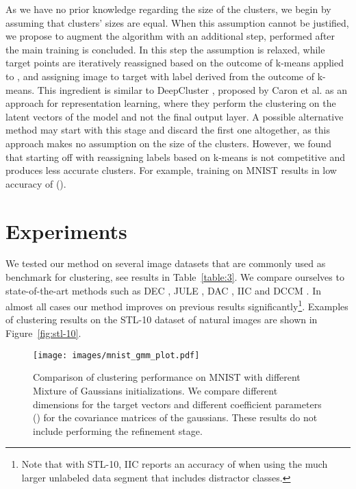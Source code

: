 \documentclass[a4paper,conference]{IEEEtran}
\begin{document}
As we have no prior knowledge regarding the size of the clusters, we begin by assuming that clusters' sizes are equal. When this assumption cannot be justified, we propose to augment the algorithm with an additional step, performed after the main training is concluded. In this step the assumption is relaxed, while target points are iteratively reassigned based on the outcome of k-means applied to , and assigning image  to target  with label  derived from the outcome of k-means. This ingredient is similar to DeepCluster \cite{caron2018deep}, proposed by Caron et al. as an approach for representation learning, where they perform the clustering on the latent vectors of the model and not the final output layer. A possible alternative method may start with this stage and discard the first one altogether, as this approach makes no assumption on the size of the clusters. However, we found that starting off with reassigning labels based on k-means is not competitive and produces less accurate clusters. For example, training on MNIST results in low accuracy of  ().

\section{Experiments}
\label{sec:exp}

We tested our method on several image datasets that are commonly used as benchmark for clustering, see results in Table~\ref{table:3}. We compare ourselves to state-of-the-art methods such as DEC \cite{Xie2015UnsupervisedDE}, JULE \cite{yangCVPR2016joint}, DAC \cite{Chang2017DeepAI}, IIC \cite{iic} and DCCM \cite{wu2019deep}. In almost all cases our method improves on previous results significantly\footnote{Note that with STL-10, IIC reports an accuracy of  when using the much larger unlabeled data segment that includes distractor classes.}. Examples of clustering results on the STL-10 dataset of natural images are shown in Figure~\ref{fig:stl-10}.

\begin{figure*}[t]
\begin{center}
\texttt{[image: images/mnist\_gmm\_plot.pdf]}
\end{center}
\caption{Comparison of clustering performance on MNIST with different Mixture of Gaussians initializations. We compare different dimensions for the target vectors and different coefficient parameters () for the covariance matrices of the gaussians. These results do not include performing the refinement stage.}
\label{fig:mnist_gmm}
\end{figure*}
\end{document}
